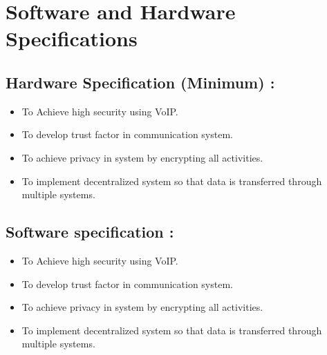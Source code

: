 \chapter{Software and Hardware Specifications}
\section{Hardware Specification (Minimum) :}
\justify
\quad
\begin{itemize}
    \item To Achieve high security using VoIP.
    \item To develop trust factor in communication system.
    \item To achieve privacy in system by encrypting all activities.
    \item To implement decentralized system so that data is transferred through multiple systems.
\end{itemize}

\section{Software specification :}
\justify
\quad
\begin{itemize}
    \item To Achieve high security using VoIP.
    \item To develop trust factor in communication system.
    \item To achieve privacy in system by encrypting all activities.
    \item To implement decentralized system so that data is transferred through multiple systems.
\end{itemize}

\newpage